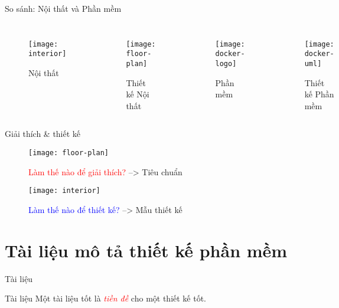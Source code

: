 \documentclass{beamer}
\newcommand{\ul}[1]{\emph{#1}}
\begin{document}
\begin{frame}[label=interiors]{So sánh: Nội thất và Phần mềm}
    \begin{columns}
        \begin{figure}
            \centering
            \texttt{[image: interior]}
            \caption{Nội thất}
        \end{figure}
        \begin{figure}
            \centering
            \texttt{[image: floor-plan]}
            \caption{Thiết kế Nội thất}
        \end{figure}
        \begin{figure}
            \centering
            \texttt{[image: docker-logo]}
            \caption{Phần mềm}
        \end{figure}
        \begin{figure}
            \centering
            \texttt{[image: docker-uml]}
            \caption{Thiết kế Phần mềm}
        \end{figure}
    \end{columns}
\end{frame}

\begin{frame}{Giải thích \& thiết kế}
    \begin{figure}
        \centering
        \texttt{[image: floor-plan]}
        \caption{ {\textcolor{red}{Làm thế nào để giải thích?} --> Tiêu chuẩn} }
    \end{figure}
    \begin{figure}
        \centering
        \texttt{[image: interior]}
        \caption{ {\textcolor{blue}{Làm thế nào để thiết kế?} --> Mẫu thiết kế} }
    \end{figure}
\end{frame}

\section{Tài liệu mô tả thiết kế phần mềm}

\begin{frame}[label=sdd]{Tài liệu}
    \begin{block}{Tài liệu}
        \Huge
        Một tài liệu tốt là \textcolor{red}{\ul{tiền đề}} cho một thiết kế tốt.
    \end{block}
\end{frame}
\end{document}
